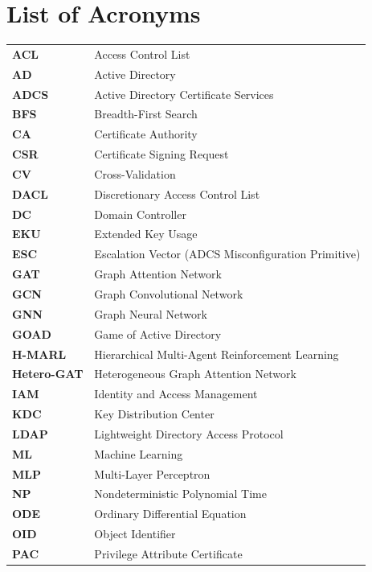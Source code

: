 \chapter*{List of Acronyms}

\begin{singlespace}
\begin{tabularx}{\textwidth}{lX}
\textbf{ACL} & Access Control List \\
\textbf{AD} & Active Directory \\
\textbf{ADCS} & Active Directory Certificate Services \\
\textbf{BFS} & Breadth-First Search \\
\textbf{CA} & Certificate Authority \\
\textbf{CSR} & Certificate Signing Request \\
\textbf{CV} & Cross-Validation \\
\textbf{DACL} & Discretionary Access Control List \\
\textbf{DC} & Domain Controller \\
\textbf{EKU} & Extended Key Usage \\
\textbf{ESC} & Escalation Vector (ADCS Misconfiguration Primitive) \\
\textbf{GAT} & Graph Attention Network \\
\textbf{GCN} & Graph Convolutional Network \\
\textbf{GNN} & Graph Neural Network \\
\textbf{GOAD} & Game of Active Directory \\
\textbf{H-MARL} & Hierarchical Multi-Agent Reinforcement Learning \\
\textbf{Hetero-GAT} & Heterogeneous Graph Attention Network \\
\textbf{IAM} & Identity and Access Management \\
\textbf{KDC} & Key Distribution Center \\
\textbf{LDAP} & Lightweight Directory Access Protocol \\
\textbf{ML} & Machine Learning \\
\textbf{MLP} & Multi-Layer Perceptron \\
\textbf{NP} & Nondeterministic Polynomial Time \\
\textbf{ODE} & Ordinary Differential Equation \\
\textbf{OID} & Object Identifier \\
\textbf{PAC} & Privilege Attribute Certificate \\

\end{tabularx}
\end{singlespace}
